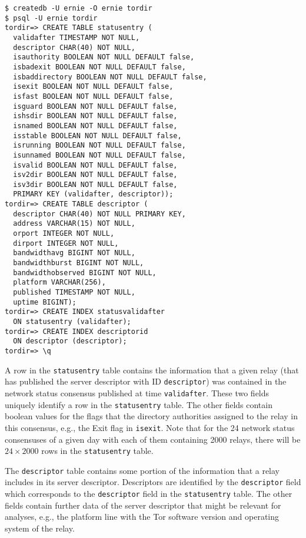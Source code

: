 \documentclass{article}
\begin{document}
\begin{verbatim}
$ createdb -U ernie -O ernie tordir
$ psql -U ernie tordir
tordir=> CREATE TABLE statusentry (
  validafter TIMESTAMP NOT NULL,
  descriptor CHAR(40) NOT NULL,
  isauthority BOOLEAN NOT NULL DEFAULT false,
  isbadexit BOOLEAN NOT NULL DEFAULT false,
  isbaddirectory BOOLEAN NOT NULL DEFAULT false,
  isexit BOOLEAN NOT NULL DEFAULT false,
  isfast BOOLEAN NOT NULL DEFAULT false,
  isguard BOOLEAN NOT NULL DEFAULT false,
  ishsdir BOOLEAN NOT NULL DEFAULT false,
  isnamed BOOLEAN NOT NULL DEFAULT false,
  isstable BOOLEAN NOT NULL DEFAULT false,
  isrunning BOOLEAN NOT NULL DEFAULT false,
  isunnamed BOOLEAN NOT NULL DEFAULT false,
  isvalid BOOLEAN NOT NULL DEFAULT false,
  isv2dir BOOLEAN NOT NULL DEFAULT false,
  isv3dir BOOLEAN NOT NULL DEFAULT false,
  PRIMARY KEY (validafter, descriptor));
tordir=> CREATE TABLE descriptor (
  descriptor CHAR(40) NOT NULL PRIMARY KEY,
  address VARCHAR(15) NOT NULL,
  orport INTEGER NOT NULL,
  dirport INTEGER NOT NULL,
  bandwidthavg BIGINT NOT NULL,
  bandwidthburst BIGINT NOT NULL,
  bandwidthobserved BIGINT NOT NULL,
  platform VARCHAR(256),
  published TIMESTAMP NOT NULL,
  uptime BIGINT);
tordir=> CREATE INDEX statusvalidafter
  ON statusentry (validafter);
tordir=> CREATE INDEX descriptorid
  ON descriptor (descriptor);
tordir=> \q
\end{verbatim}

A row in the \verb+statusentry+ table contains the information that a
given relay (that has published the server descriptor with ID
\verb+descriptor+) was contained in the network status consensus published
at time \verb+validafter+.
These two fields uniquely identify a row in the \verb+statusentry+ table.
The other fields contain boolean values for the flags that the directory
authorities assigned to the relay in this consensus, e.g., the Exit flag
in \verb+isexit+.
Note that for the 24 network status consensuses of a given day with each
of them containing 2000 relays, there will be $24 \times 2000$ rows in the
\verb+statusentry+ table.

The \verb+descriptor+ table contains some portion of the information that
a relay includes in its server descriptor.
Descriptors are identified by the \verb+descriptor+ field which
corresponds to the \verb+descriptor+ field in the \verb+statusentry+
table.
The other fields contain further data of the server descriptor that might
be relevant for analyses, e.g., the platform line with the Tor software
version and operating system of the relay.
\end{document}
